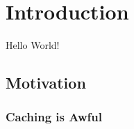 \chapter{Introduction}

Hello World!\cite{pattersonComputerOrganizationDesign2018}

\section{Motivation}

\subsection{Caching is Awful}